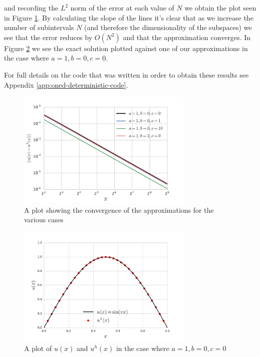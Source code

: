 and recording the $L^2$ norm of the error at each value of $N$ we obtain the
plot seen in Figure \ref{fig:oned-deterministic-error}. By calculating the slope
of the lines it's clear that as we increase the number of subintervals $N$ (and
therefore the dimensionality of the subspaces) we see that the error reduces by
$O(N^2)$ and that the approximation converges. In Figure
\ref{fig:oned-deterministic-exact-v-approx} we see the exact solution plotted
against one of our approximations in the case where $a = 1, b = 0, c = 0$.

For full details on the code that was written in order to obtain these results
see Appendix \ref{app:oned-deterministic-code}.

\begin{figure}
    \centering
    \includegraphics[width=0.75\textwidth]{img/one-d-deterministic-error.pdf}
    \caption{A plot showing the convergence of the approximations for the
             various cases}
    \label{fig:oned-deterministic-error}
\end{figure}

\begin{figure}
    \centering
    \includegraphics[width=0.75\textwidth]{img/oned-deterministic-plot.pdf}
    \caption{A plot of $u(x)$ and $u^h(x)$ in the case where $a=1, b=0, c=0$}
    \label{fig:oned-deterministic-exact-v-approx}
\end{figure}

